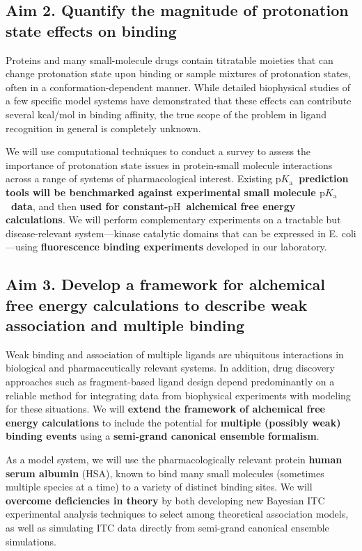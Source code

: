 \documentclass[10pt,final]{article}
\newcommand{\pKa}{$\mathrm{p}K_\mathrm{a}$\ }
\newcommand{\pH}{$\mathrm{pH}$\ }
\begin{document}
\subsection*{Aim 2. Quantify the magnitude of protonation state effects on binding}
Proteins and many small-molecule drugs contain titratable moieties that can change protonation state upon binding or sample mixtures of protonation states, often in a conformation-dependent manner.
While detailed biophysical studies of a few specific model systems have demonstrated that these effects can contribute several kcal/mol in binding affinity, the true scope of the problem in ligand recognition in general is completely unknown.

We will use computational techniques to conduct a survey to assess the importance of protonation state issues in protein-small molecule interactions across a range of systems of pharmacological interest.
Existing \textbf{ \pKa prediction tools will be benchmarked against experimental small molecule \pKa data}, and then \textbf{ used for constant-\pH alchemical free energy calculations}.
We will perform complementary experiments on a tractable but disease-relevant system---kinase catalytic domains that can be expressed in E. coli---using \textbf{ fluorescence binding experiments } developed in our laboratory.

\subsection*{Aim 3. Develop a framework for alchemical free energy calculations to describe weak association and multiple binding}
Weak binding and association of multiple ligands are ubiquitous interactions in biological and pharmaceutically relevant systems.
In addition, drug discovery approaches such as fragment-based ligand design depend predominantly on a reliable method for integrating data from biophysical experiments with modeling for these situations.
We will \textbf{ extend the framework of alchemical free energy calculations}  to include the potential for \textbf{ multiple (possibly weak) binding events } using a \textbf{ semi-grand canonical ensemble formalism}.

As a model system, we will use the pharmacologically relevant protein \textbf{ human serum albumin } (HSA), known to bind many small molecules (sometimes multiple species at a time) to a variety of distinct binding sites.
We will  \textbf{ overcome deficiencies in theory } by both developing new Bayesian ITC experimental analysis techniques to select among theoretical association models, as well as simulating ITC data directly from semi-grand canonical ensemble simulations.
\end{document}
